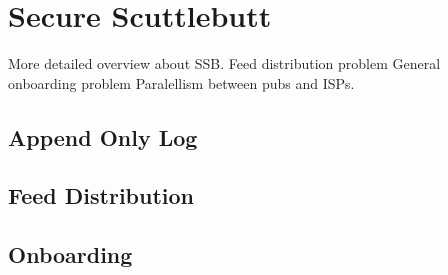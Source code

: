 \chapter{Secure Scuttlebutt}
More detailed overview about SSB.
Feed distribution problem
General onboarding problem
Paralellism between pubs and ISPs.
\section{Append Only Log}
\section{Feed Distribution}
\section{Onboarding}